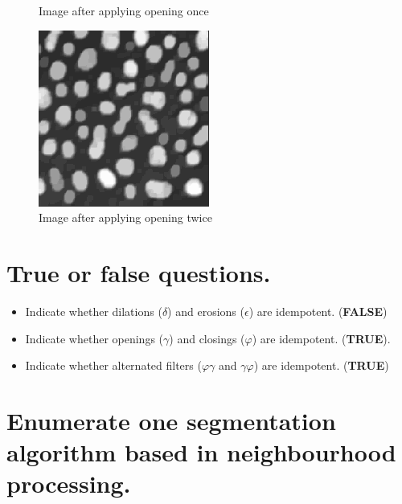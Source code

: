 \documentclass{article}
\begin{document}
\begin{figure}[!h]
  \caption{Image after applying opening once}\label{fig:awesome_image2}
\endminipage\hfill
{}%
  \includegraphics[width=\linewidth]{report/exam/images/exercise_05a_output-02.png}
  \caption{Image after applying opening twice}\label{fig:awesome_image3}
\endminipage
\end{figure}

\section{True or false questions.}

\begin{itemize}
    \item Indicate whether dilations ($\delta$) and erosions ($\epsilon$) are idempotent. (\textbf{FALSE})
    \item Indicate whether openings ($\gamma$) and closings ($\varphi$) are idempotent. (\textbf{TRUE}).
    \item Indicate whether alternated filters ($\varphi\gamma$ and $\gamma\varphi$) are idempotent. (\textbf{TRUE})
\end{itemize}

\section{Enumerate one segmentation algorithm based in neighbourhood processing.}
\end{document}
